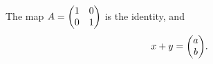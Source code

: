 \documentclass{article}
\newenvironment{mat}{\begin{pmatrix}}{\end{pmatrix}}
\begin{document}
The map $A = \begin{mat} 1 & 0 \\ 0 & 1 \end{mat}$ is the identity, and
\[ x + y = \begin{mat} a \\ b \end{mat}. \]
\end{document}
